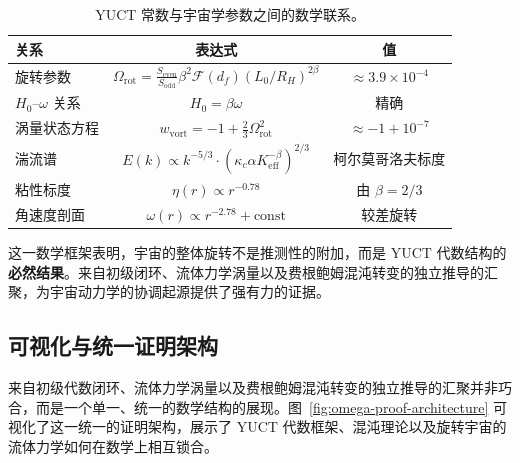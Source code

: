 \documentclass[11pt,a4paper]{article}
\begin{document}
	\begin{table}[htbp]
		\centering
		\caption{YUCT 常数与宇宙学参数之间的数学联系。}
		\label{tab:math-connections}
		\begin{tabular}{l c c}
			\toprule
			\textbf{关系} & \textbf{表达式} & \textbf{值} \\
			\midrule
			旋转参数 & \(\Omega_{\mathrm{rot}} = \frac{S_{\mathrm{even}}}{S_{\mathrm{odd}}} \beta^2 \mathcal{F}(d_f) (L_0/R_H)^{2\beta}\) & \(\approx 3.9 \times 10^{-4}\) \\
			\(H_0\)–\(\omega\) 关系 & \(H_0 = \beta \omega\) & 精确 \\
			涡量状态方程 & \(w_{\mathrm{vort}} = -1 + \frac{2}{3}\Omega_{\mathrm{rot}}^2\) & \(\approx -1 + 10^{-7}\) \\
			湍流谱 & \(E(k) \propto k^{-5/3} \cdot (\kappa_c \alpha K_{\mathrm{eff}}^{-\beta})^{2/3}\) & 柯尔莫哥洛夫标度 \\
			粘性标度 & \(\eta(r) \propto r^{-0.78}\) & 由 \(\beta = 2/3\) \\
			角速度剖面 & \(\omega(r) \propto r^{-2.78} + \text{const}\) & 较差旋转 \\
			\bottomrule
		\end{tabular}
	\end{table}
	
	这一数学框架表明，宇宙的整体旋转不是推测性的附加，而是 YUCT 代数结构的\textbf{必然结果}。来自初级闭环、流体力学涡量以及费根鲍姆混沌转变的独立推导的汇聚，为宇宙动力学的协调起源提供了强有力的证据。
	
	\subsection{可视化与统一证明架构}
	\label{subsec:visualization}
	
	来自初级代数闭环、流体力学涡量以及费根鲍姆混沌转变的独立推导的汇聚并非巧合，而是一个单一、统一的数学结构的展现。图~\ref{fig:omega-proof-architecture} 可视化了这一统一的证明架构，展示了 YUCT 代数框架、混沌理论以及旋转宇宙的流体力学如何在数学上相互锁合。
	
\end{document}
